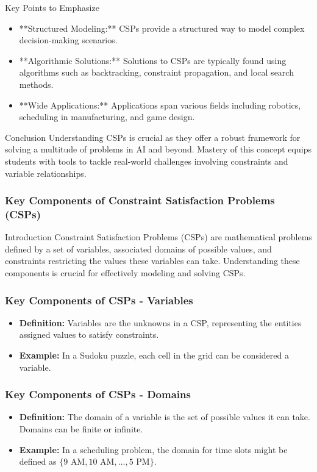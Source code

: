 \documentclass[aspectratio=169]{beamer}
\begin{document}
\begin{frame}[fragile]{Key Points to Emphasize}
  \begin{itemize}
    \item **Structured Modeling:** CSPs provide a structured way to model complex decision-making scenarios.
    \item **Algorithmic Solutions:** Solutions to CSPs are typically found using algorithms such as backtracking, constraint propagation, and local search methods.
    \item **Wide Applications:** Applications span various fields including robotics, scheduling in manufacturing, and game design.
  \end{itemize}
\end{frame}

\begin{frame}[fragile]{Conclusion}
  Understanding CSPs is crucial as they offer a robust framework for solving a multitude of problems in AI and beyond. Mastery of this concept equips students with tools to tackle real-world challenges involving constraints and variable relationships.
\end{frame}

\begin{frame}[fragile]
    \frametitle{Key Components of Constraint Satisfaction Problems (CSPs)}
    \begin{block}{Introduction}
        Constraint Satisfaction Problems (CSPs) are mathematical problems defined by a set of variables, associated domains of possible values, and constraints restricting the values these variables can take. Understanding these components is crucial for effectively modeling and solving CSPs.
    \end{block}
\end{frame}

\begin{frame}[fragile]
    \frametitle{Key Components of CSPs - Variables}
    \begin{itemize}
        \item \textbf{Definition:} Variables are the unknowns in a CSP, representing the entities assigned values to satisfy constraints.
        \item \textbf{Example:} In a Sudoku puzzle, each cell in the grid can be considered a variable.
    \end{itemize}
\end{frame}

\begin{frame}[fragile]
    \frametitle{Key Components of CSPs - Domains}
    \begin{itemize}
        \item \textbf{Definition:} The domain of a variable is the set of possible values it can take. Domains can be finite or infinite.
        \item \textbf{Example:} In a scheduling problem, the domain for time slots might be defined as $\{9 \text{ AM}, 10 \text{ AM}, \ldots, 5 \text{ PM}\}$.
    \end{itemize}
\end{frame}
\end{document}
